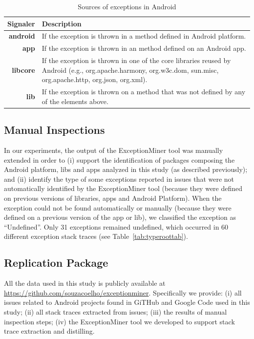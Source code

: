 \documentclass[conference]{IEEEtran}
\begin{document}

\begin{table}
  \centering
  \begin{tabular}{rp{29em}}
    \hline
    \bfseries{Signaler} & \bfseries{Description} \\
    \hline
    \bfseries{android} & If the exception is thrown in a method defined in Android platform.\\
    \bfseries{app}     & If the exception is thrown in an method defined on an Android app.\\
    \bfseries{libcore} & If the exception is thrown in one of the core libraries reused by Android (e.g., org.apache.harmony, org.w3c.dom, sun.misc, org.apache.http, org.json, org.xml). \\
    \bfseries{lib}     & If the exception is thrown on a method that was not defined by any of the elements above.\\
    \hline
  \end{tabular}
  \caption{Sources of exceptions in Android}
  \label{tab:signalers}
\end{table}

\subsection{Manual Inspections}
\label{sec:manual}
In our experiments, the output of the ExceptionMiner tool was manually extended
in order to 
(i) support the identification of packages composing the Android platform, 
libs and apps analyzed in this study (as described previously); and (ii)  
identify the type of some exceptions reported in issues 
that were not automatically identified by the ExceptionMiner tool
(because they were defined on previous versions of libraries,
apps and Android Platform). When the exception could not be  
found automatically or manually (because they were defined on a previous version
of the app or lib), we classified the exception as ``Undefined''.  Only 31 exceptions 
remained undefined, which occurred in 60 different exception stack traces (see Table~\ref{tab:typeroottab}).

\subsection{Replication Package}
All the data used in this study is publicly available at \url{https://github.com/souzacoelho/exceptionminer}.
Specifically we provide: (i) all issues related to Android projects found
in GiTHub and Google Code used in this study; (ii) all stack traces extracted
from issues; (iii) the results of manual inspection steps; (iv) the
ExceptionMiner tool we developed to support stack trace extraction and distilling.
\end{document}

